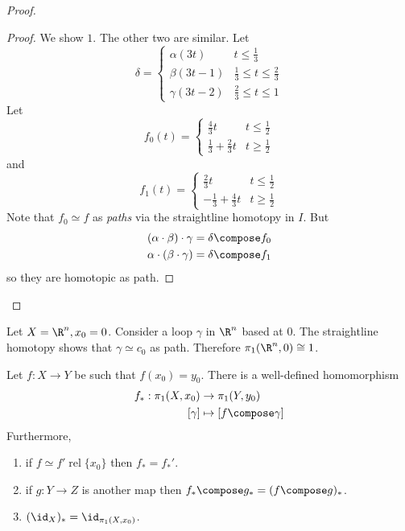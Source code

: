 \documentclass[a4paper]{article}
\DeclareMathOperator{\rel}{rel}
\begin{document}
\begin{proof}
  \begin{proof}
    We show \(1\). The other two are similar. Let
    \[
      \delta =
      \begin{cases}
        \alpha(3t) & t \leq \frac{1}{3} \\
        \beta(3t - 1) & \frac{1}{3} \leq t \leq \frac{2}{3} \\
        \gamma(3t - 2) & \frac{2}{3} \leq t \leq 1
      \end{cases}
    \]
    Let
    \[
      f_0(t) =
      \begin{cases}
        \frac{4}{3}t & t \leq \frac{1}{2} \\
        \frac{1}{3} + \frac{2}{3} t & t \geq \frac{1}{2}
      \end{cases}
    \]
    and
    \[
      f_1(t) =
      \begin{cases}
        \frac{2}{3}t & t \leq \frac{1}{2} \\
        -\frac{1}{3} + \frac{4}{3}t & t \geq \frac{1}{2}
      \end{cases}
    \]
    Note that \(f_0 \simeq f\) as \emph{paths} via the straightline homotopy in \(I\). But
    \begin{align*}
      (\alpha \cdot \beta) \cdot \gamma &= \delta \compose f_0 \\
      \alpha \cdot (\beta \cdot \gamma) &= \delta \compose f_1
    \end{align*}
    so they are homotopic as path.
  \end{proof}
\end{proof}

\begin{eg}
  Let \(X = \R^n, x_0 = 0\). Consider a loop \(\gamma\) in \(\R^n\) based at \(0\). The straightline homotopy shows that \(\gamma \simeq c_0\) as path. Therefore \(\pi_1(\R^n, 0) \cong 1\).
\end{eg}

\begin{lemma}
  Let \(f: X \to Y\) be such that \(f(x_0) = y_0\). There is a well-defined homomorphism
  \begin{align*}
    f_*: \pi_1(X, x_0) &\to \pi_1(Y, y_0) \\
    [\gamma] &\mapsto [f \compose \gamma]
  \end{align*}
  Furthermore,
  \begin{enumerate}
  \item if \(f \simeq f' \rel \{x_0\}\) then \(f_* = f_*'\).
  \item if \(g: Y \to Z\) is another map then \(f_* \compose g_* = (f \compose g)_*\).
  \item \((\id_X)_* = \id_{\pi_1(X, x_0)}\).
  \end{enumerate}
\end{lemma}
\end{document}
